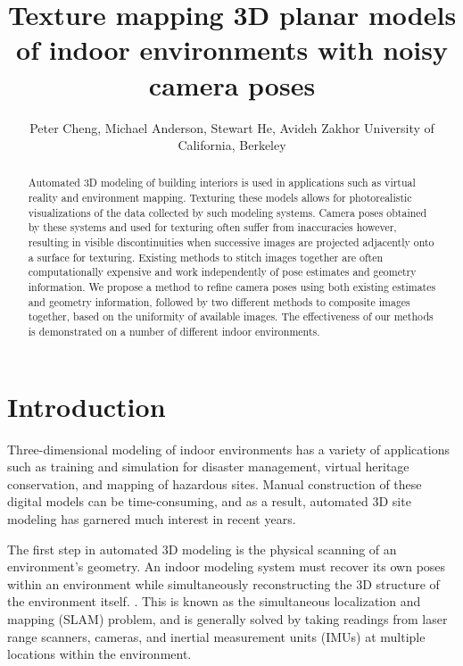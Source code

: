 \documentclass[]{spie}  %
\title{Texture mapping 3D planar models of indoor environments with noisy camera poses}
\author{Peter Cheng, Michael Anderson, Stewart He, Avideh Zakhor
\skiplinehalf
University of California, Berkeley\\
}
\begin{document}
\maketitle

\begin{abstract}

  Automated 3D modeling of building interiors is used in applications
  such as virtual reality and environment mapping. Texturing these
  models allows for photorealistic visualizations of the data
  collected by such modeling systems. Camera poses obtained by these
  systems and used for texturing often suffer from inaccuracies
  however, resulting in visible discontinuities when successive images
  are projected adjacently onto a surface for texturing. Existing
  methods to stitch images together are often computationally
  expensive and work independently of pose estimates and geometry
  information. We propose a method to refine camera poses using both
  existing estimates and geometry information, followed by two
  different methods to composite images together, based on the
  uniformity of available images. The effectiveness of our methods is
  demonstrated on a number of different indoor environments.
\end{abstract}



\section{Introduction}
\label{sec:introduction} %

Three-dimensional modeling of indoor environments has a variety of
applications such as training and simulation for disaster management,
virtual heritage conservation, and mapping of hazardous sites. Manual
construction of these digital models can be time-consuming, and as a
result, automated 3D site modeling has garnered much interest in
recent years.

The first step in automated 3D modeling is the physical scanning of an
environment's geometry. An indoor modeling system must recover its own
poses within an environment while simultaneously reconstructing the 3D
structure of the environment itself. \cite{chen2010indoor,
  liu2010indoor, kua2012loopclosure}. This is known as the
simultaneous localization and mapping (SLAM) problem, and is generally
solved by taking readings from laser range scanners, cameras, and
inertial measurement units (IMUs) at multiple locations within the
environment.
\end{document}
